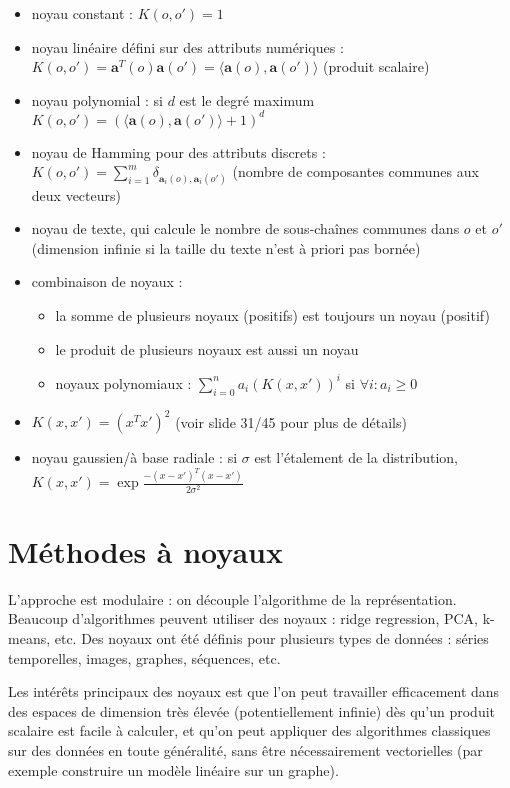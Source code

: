 \begin{itemize}
	\item noyau constant : $K(o, o') = 1$
	\item noyau linéaire défini sur des attributs numériques : $K(o, o') = \mathbf{a}^T(o) \mathbf{a}(o') = \langle \mathbf{a}(o), \mathbf{a}(o')\rangle$ (produit scalaire)
	\item noyau polynomial : si $d$ est le degré maximum $K(o, o') = (\langle \mathbf{a}(o), \mathbf{a}(o') \rangle + 1)^d$
	\item noyau de Hamming pour des attributs discrets : $K(o, o') = \sum_{i = 1}^m \delta_{\mathbf{a}_i(o), \mathbf{a}_i(o')}$ (nombre de composantes communes aux deux vecteurs)
	\item noyau de texte, qui calcule le nombre de sous-chaînes communes dans $o$ et $o'$ (dimension infinie si la taille du texte n'est à priori pas bornée)
	\item combinaison de noyaux :
	
	\begin{itemize}
		\item la somme de plusieurs noyaux (positifs) est toujours un noyau (positif)
		\item le produit de plusieurs noyaux est aussi un noyau
		\item noyaux polynomiaux : $\sum_{i = 0}^n a_i(K(x, x'))^i$ si $\forall i : a_i \geq 0$
	\end{itemize}
	
	\item $K(x, x') = (x^Tx')^2$ (voir slide 31/45 pour plus de détails)
	\item noyau gaussien/à base radiale : si $\sigma$ est l'étalement de la distribution, $K(x, x') = \exp{\frac{-(x - x')^T(x - x')}{2 \sigma^2}}$
\end{itemize}


\section{Méthodes à noyaux}


L'approche est modulaire : on découple l'algorithme de la représentation. Beaucoup d'algorithmes peuvent utiliser des noyaux : ridge regression, PCA, k-means, etc. Des noyaux ont été définis pour plusieurs types de données : séries temporelles, images, graphes, séquences, etc.

Les intérêts principaux des noyaux est que l'on peut travailler efficacement dans des espaces de dimension très élevée (potentiellement infinie) dès qu'un produit scalaire est facile à calculer, et qu'on peut appliquer des algorithmes classiques sur des données en toute généralité, sans être nécessairement vectorielles (par exemple construire un modèle linéaire sur un graphe).

